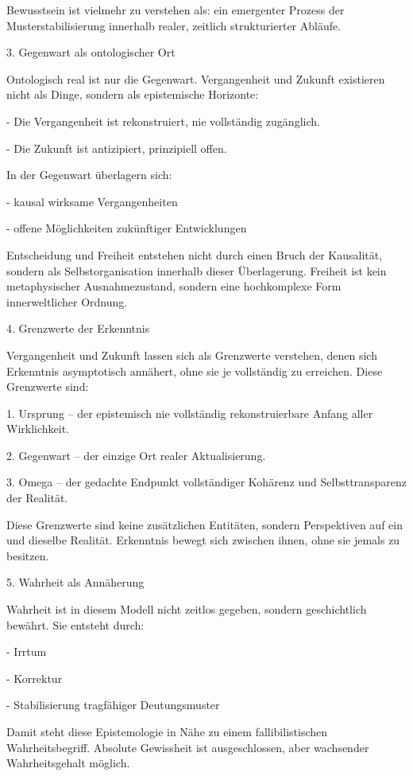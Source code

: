 \documentclass[
  ngerman,
]{article}
\begin{document}
Bewusstsein ist vielmehr zu verstehen als: ein emergenter Prozess der
Musterstabilisierung innerhalb realer, zeitlich strukturierter Abläufe.

3. Gegenwart als ontologischer Ort

Ontologisch real ist nur die Gegenwart. Vergangenheit und Zukunft
existieren nicht als Dinge, sondern als epistemische Horizonte:

- Die Vergangenheit ist rekonstruiert, nie vollständig zugänglich.

- Die Zukunft ist antizipiert, prinzipiell offen.

In der Gegenwart überlagern sich:

- kausal wirksame Vergangenheiten

- offene Möglichkeiten zukünftiger Entwicklungen

Entscheidung und Freiheit entstehen nicht durch einen Bruch der
Kausalität, sondern als Selbstorganisation innerhalb dieser
Überlagerung. Freiheit ist kein metaphysischer Ausnahmezustand, sondern
eine hochkomplexe Form innerweltlicher Ordnung.

4. Grenzwerte der Erkenntnis

Vergangenheit und Zukunft lassen sich als Grenzwerte verstehen, denen
sich Erkenntnis asymptotisch annähert, ohne sie je vollständig zu
erreichen. Diese Grenzwerte sind:

1. Ursprung -- der epistemisch nie vollständig rekonstruierbare Anfang
aller Wirklichkeit.

2. Gegenwart -- der einzige Ort realer Aktualisierung.

3. Omega -- der gedachte Endpunkt vollständiger Kohärenz und
Selbsttransparenz der Realität.

Diese Grenzwerte sind keine zusätzlichen Entitäten, sondern Perspektiven
auf ein und dieselbe Realität. Erkenntnis bewegt sich zwischen ihnen,
ohne sie jemals zu besitzen.

5. Wahrheit als Annäherung

Wahrheit ist in diesem Modell nicht zeitlos gegeben, sondern
geschichtlich bewährt. Sie entsteht durch:

- Irrtum

- Korrektur

- Stabilisierung tragfähiger Deutungsmuster

Damit steht diese Epistemologie in Nähe zu einem fallibilistischen
Wahrheitsbegriff. Absolute Gewissheit ist ausgeschlossen, aber
wachsender Wahrheitsgehalt möglich.
\end{document}
